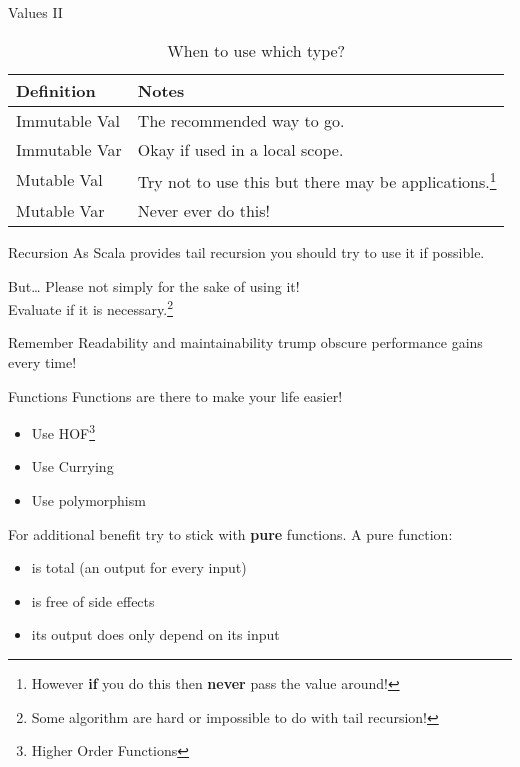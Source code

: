 \documentclass[10pt]{beamer}
\begin{document}
  \begin{frame}{Values II}
    \begin{table}
      \caption{When to use which type?}
      \begin{tabular}{@{} ll @{}}
	\toprule
	Definition & Notes\\
	\midrule
	Immutable Val & The recommended way to go.\\
	Immutable Var & Okay if used in a local scope.\\
	Mutable Val & Try not to use this but there may be applications.\footnote{However \textbf{if} you do this then \textbf{never} pass the value around!}\\
	Mutable Var & \alert{Never ever do this!}\\
	\bottomrule
      \end{tabular}
    \end{table}
  \end{frame}

  \begin{frame}{Recursion}
    As Scala provides tail recursion you should try to use it if possible.
    \begin{alertblock}{But\ldots}
      Please not simply for the sake of using it!\\
      Evaluate if it is necessary.\footnote{Some algorithm are hard or impossible to do with tail recursion!}
    \end{alertblock}
    \begin{block}{Remember}
      Readability and maintainability trump obscure performance gains every time!
    \end{block}
  \end{frame}

  \begin{frame}{Functions}
    Functions are there to make your life easier!
    \begin{itemize}
      \item Use HOF\footnote{Higher Order Functions}
      \item Use Currying
      \item Use polymorphism
    \end{itemize}
    For additional benefit try to stick with \textbf{pure} functions.
    A pure function:
    \begin{itemize}
      \item is total (an output for every input)
      \item is free of side effects
      \item its output does only depend on its input
    \end{itemize}
  \end{frame}
\end{document}
